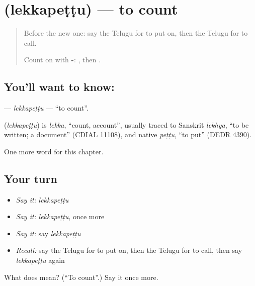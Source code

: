\section[\texorpdfstring{\te{లెక్కపెట్టు} (lekkapeṭṭu)}{లెక్కపెట్టు (lekkapeṭṭu)}]{ (lekkapeṭṭu) — to count}

\label{lesson:TE-C146-lekkapettu}



\begin{quote}
Before the new one: say the Telugu for to put on, then the Telugu for to call.

Count on with \textbf{-}: \textbf{}, then \textbf{}.
\end{quote}

\subsection*{You'll want to know: }
\textbf{} — \emph{lekkapeṭṭu} — \textquotedblleft{}to count\textquotedblright{}.

\begin{cousinweb}
\textbf{} (\emph{lekkapeṭṭu}) is \emph{lekka}, \textquotedblleft{}count, account\textquotedblright{}, usually traced to Sanskrit \emph{lekhya}, \textquotedblleft{}to be written; a document\textquotedblright{} (CDIAL 11108), and native \emph{peṭṭu}, \textquotedblleft{}to put\textquotedblright{} (DEDR 4390).
\end{cousinweb}

\begin{grammarlens}[title={What you've built}]
One more word for this chapter.
\end{grammarlens}

\subsection*{Your turn}
\begin{itemize}
\raggedright
  \item \emph{Say it:} \emph{lekkapeṭṭu}
  \item \emph{Say it:} \emph{lekkapeṭṭu}, once more
  \item \emph{Say it:} say \emph{lekkapeṭṭu}
  \item \emph{Recall:} say the Telugu for to put on, then the Telugu for to call, then say \emph{lekkapeṭṭu} again
\end{itemize}

\begin{tcolorbox}[breakable,colback=teal!4,colframe=teal!35!black,title={Before you move on}]
What does  mean? (\textquotedblleft{}To count\textquotedblright{}.) Say it once more.
\end{tcolorbox}

